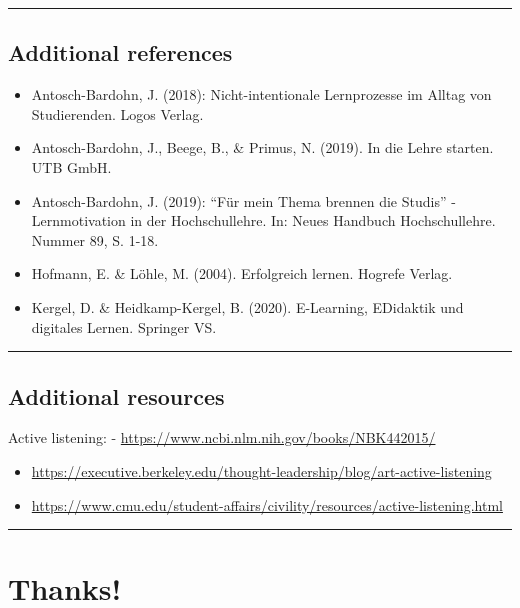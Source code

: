 \documentclass[
  letterpaper,
  DIV=11,
  numbers=noendperiod]{scrartcl}
\begin{document}
\begin{center}\rule{0.5\linewidth}{0.5pt}\end{center}

\subsection{Additional references}\label{additional-references}

\begin{itemize}
\item
  Antosch-Bardohn, J. (2018): Nicht-intentionale Lernprozesse im Alltag
  von Studierenden. Logos Verlag.
\item
  Antosch-Bardohn, J., Beege, B., \& Primus, N. (2019). In die Lehre
  starten. UTB GmbH.
\item
  Antosch-Bardohn, J. (2019): ``Für mein Thema brennen die Studis'' -
  Lernmotivation in der Hochschullehre. In: Neues Handbuch
  Hochschullehre. Nummer 89, S. 1-18.
\item
  Hofmann, E. \& Löhle, M. (2004). Erfolgreich lernen. Hogrefe Verlag.
\item
  Kergel, D. \& Heidkamp-Kergel, B. (2020). E-Learning, EDidaktik und
  digitales Lernen. Springer VS.
\end{itemize}

\begin{center}\rule{0.5\linewidth}{0.5pt}\end{center}

\subsection{Additional resources}\label{additional-resources}

Active listening: - \url{https://www.ncbi.nlm.nih.gov/books/NBK442015/}

\begin{itemize}
\item
  \url{https://executive.berkeley.edu/thought-leadership/blog/art-active-listening}
\item
  \url{https://www.cmu.edu/student-affairs/civility/resources/active-listening.html}
\end{itemize}

\begin{center}\rule{0.5\linewidth}{0.5pt}\end{center}

\section{Thanks!}\label{thanks}
\end{document}
